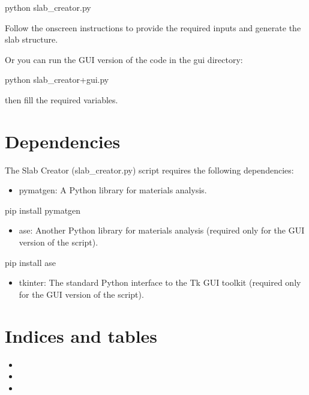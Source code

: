 \documentclass[letterpaper,10pt,english]{sphinxmanual}
\begin{document}
\sphinxAtStartPar
python slab\_creator.py

\sphinxAtStartPar
Follow the on\sphinxhyphen{}screen instructions to provide the required inputs and generate the slab structure.

\sphinxAtStartPar
Or you can run the GUI version of the code in the gui directory:

\sphinxAtStartPar
python slab\_creator+gui.py

\sphinxAtStartPar
then fill the required variables.

\sphinxstepscope


\chapter{Dependencies}
\label{\detokenize{dependencies:dependencies}}\label{\detokenize{dependencies::doc}}
\sphinxAtStartPar
The Slab Creator (slab\_creator.py) script requires the following dependencies:
\begin{itemize}
\item {} 
\sphinxAtStartPar
pymatgen: A Python library for materials analysis.

\end{itemize}

\sphinxAtStartPar
pip install pymatgen
\begin{itemize}
\item {} 
\sphinxAtStartPar
ase: Another Python library for materials analysis (required only for the GUI version of the script).

\end{itemize}

\sphinxAtStartPar
pip install ase
\begin{itemize}
\item {} 
\sphinxAtStartPar
tkinter: The standard Python interface to the Tk GUI toolkit (required only for the GUI version of the script).

\end{itemize}


\chapter{Indices and tables}
\label{\detokenize{index:indices-and-tables}}\begin{itemize}
\item {} 
\sphinxAtStartPar
{}

\item {} 
\sphinxAtStartPar
{}

\item {} 
\sphinxAtStartPar
{}

\end{itemize}



\renewcommand{\indexname}{Index}
\printindex
\end{document}
